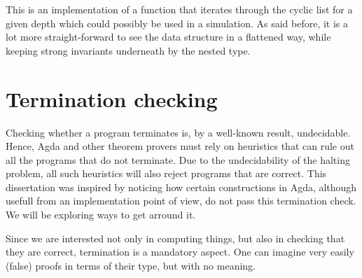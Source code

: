 \documentclass[12pt,twoside,notitlepage]{report}
\newcommand{\Conid}[1]{\mathit{#1}}
\newcommand{\Varid}[1]{\mathit{#1}}
\def\resethooks{%
  \global\let\SaveRestoreHook\empty
  \global\let\ColumnHook\empty}
\let\hspre\empty
\let\hspost\empty
\begin{document}
This is an implementation of a function that iterates through the cyclic list for a given depth which could possibly be used in a simulation. As said before, it is a lot more straight-forward to see the data structure in a flattened way, while keeping strong invariants underneath by the nested type.

\resethooks


\section{Termination checking}

Checking whether a program terminates is, by a well-known result, undecidable. Hence, Agda and other theorem provers must rely on
heuristics that can rule out all the programs that do not terminate. Due to the undecidability of the halting problem, all such
heuristics will also reject programs that are correct. This dissertation was inspired by noticing how certain constructions in Agda,
although usefull from an implementation point of view, do not pass this termination check. We will be exploring ways to get
arround it.

Since we are interested not only in computing things, but also in checking that they are correct, termination is a mandatory aspect.
One can imagine very easily (false) proofs in terms of their type, but with no meaning.
\end{document}
